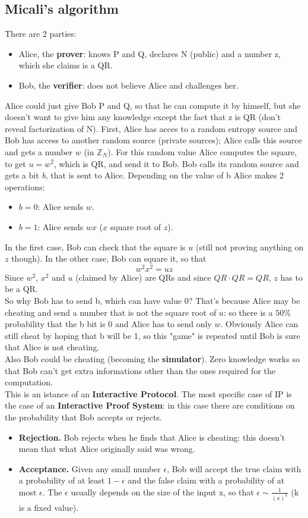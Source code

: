 \documentclass[a4paper, 10pt, titlepage]{article}
\begin{document}
\subsection{Micali's algorithm}
There are 2 parties:
\begin{itemize}
\item Alice, the \textbf{prover}: knows P and Q, declares N (public) and a number z, which she claims is a QR.
\item Bob, the \textbf{verifier}: does not believe Alice and challenges her.
\end{itemize}
Alice could just give Bob P and Q, so that he can compute it by himself, but she doesn't want to give him any knowledge except the fact that z is QR (don't reveal factorization of N). First, Alice has acces to a random entropy source and Bob has access to another random source (private sources); Alice calls this source and gets a number $w$ (in $\mathbb{Z}_N$). For this random value Alice computes the square, to get $u = w^2$, which is QR, and send it to Bob. Bob calls its random source and gets a bit \textit{b}, that is sent to Alice.
Depending on the value of b Alice makes 2 operations:
\begin{itemize}
\item $b=0$: Alice sends $w$. 
\item $b=1$: Alice sends $wx$ ($x$ square root of $z$).
\end{itemize}
In the first case, Bob can check that the square is $u$ (still not proving anything on $z$ though).
In the other case, Bob can square it, so that
$$w^2x^2 = uz$$
Since $w^2$, $x^2$ and $u$ (claimed by Alice) are QRs and since $QR \cdot QR = QR$, $z$ has to be a QR.\\
So why Bob has to send b, which can have value 0? That's because Alice may be cheating and send a number that is not the square root of $u$: so there is a $50\%$ probability that the b bit is 0 and Alice has to send only $w$. Obviously Alice can still cheat by hoping that b will be 1, so this "game" is repeated until Bob is sure that Alice is not cheating. \\
Also Bob could be cheating (becoming the \textbf{simulator}). Zero knowledge works so that Bob can't get extra informations other than the ones required for the computation. \medskip\\
This is an istance of an \textbf{Interactive Protocol}. The most specific case of IP is the case of an \textbf{Interactive Proof System}: in this case there are conditions on the probability that Bob accepts or rejects.
\begin{itemize}
\item \textbf{Rejection.} Bob rejects when he finds that Alice is cheating: this doesn't mean that what Alice originally said was wrong.
\item \textbf{Acceptance.} Given any small number $\epsilon$, Bob will accept the true claim with a probability of at least $1 - \epsilon$ and the false claim with a probability of at most $\epsilon$. The $\epsilon$ usually depends on the size of the input x, so that $\epsilon \sim \frac{1}{(x)^k}$ (k is a fixed value).
\end{itemize}
\end{document}
